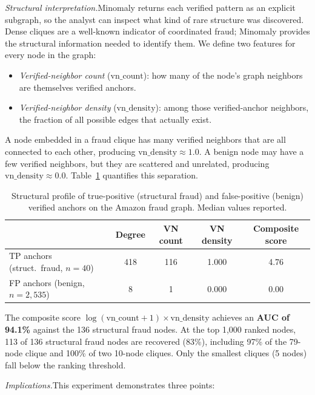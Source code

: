 \documentclass[11pt]{article}
\begin{document}
\medskip
\noindent\textit{Structural interpretation.}\quad Minomaly returns each verified pattern as an explicit subgraph, so the analyst can inspect what kind of rare structure was discovered. Dense cliques are a well-known indicator of coordinated fraud; Minomaly provides the structural information needed to identify them. We define two features for every node in the graph:
\begin{itemize}
  \item \emph{Verified-neighbor count} ($\mathrm{vn\_count}$): how many of the node's graph neighbors are themselves verified anchors.
  \item \emph{Verified-neighbor density} ($\mathrm{vn\_density}$): among those verified-anchor neighbors, the fraction of all possible edges that actually exist.
\end{itemize}
A node embedded in a fraud clique has many verified neighbors that are all connected to each other, producing $\mathrm{vn\_density} \approx 1.0$. A benign node may have a few verified neighbors, but they are scattered and unrelated, producing $\mathrm{vn\_density} \approx 0.0$. Table~\ref{tab:fraud_profile_resp} quantifies this separation.

\begin{table}[h]
\footnotesize
\centering
\caption{Structural profile of true-positive (structural fraud) and false-positive (benign) verified anchors on the Amazon fraud graph. Median values reported.}
\label{tab:fraud_profile_resp}
\begin{tabular}{lcccc}
\toprule
& \textbf{Degree} & \textbf{VN count} & \textbf{VN density} & \textbf{Composite score} \\
\midrule
TP anchors (struct.\ fraud, $n{=}40$)  & 418 & 116 & 1.000 & 4.76 \\
FP anchors (benign, $n{=}2{,}535$)      & 8   & 1   & 0.000 & 0.00 \\
\bottomrule
\end{tabular}
\end{table}

The composite score $\log(\mathrm{vn\_count}+1) \times \mathrm{vn\_density}$ achieves an \textbf{AUC of 94.1\%} against the 136 structural fraud nodes. At the top 1{,}000 ranked nodes, 113 of 136 structural fraud nodes are recovered (83\%), including 97\% of the 79-node clique and 100\% of two 10-node cliques. Only the smallest cliques (5 nodes) fall below the ranking threshold.

\noindent\textit{Implications.}\quad This experiment demonstrates three points:
\end{document}
